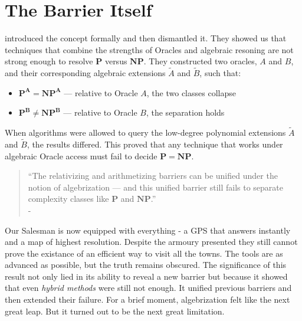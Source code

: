 \documentclass[12pt]{report}
\begin{document}
\section{The Barrier Itself}
\cite{arora2008algebrization} introduced the concept formally and then dismantled it.
They showed us that techniques that combine the strengths of Oracles and algebraic resoning are not strong enough to resolve $\mathbf{P}$ versus $\mathbf{NP}$.  
They constructed two oracles, $A$ and $B$, and their corresponding algebraic extensions $\tilde{A}$ and $\tilde{B}$, such that:
\begin{itemize}
    \item $\mathbf{P^A = NP^A}$ — relative to Oracle $A$, the two classes collapse
    \item $\mathbf{P^B \ne NP^B}$ — relative to Oracle $B$, the separation holds
\end{itemize}
When algorithms were allowed to query the low-degree polynomial extensions $\tilde{A}$ and $\tilde{B}$, the results differed.
This proved that any technique that works under algebraic Oracle access must fail to decide $\mathbf{P = NP}$.
\begin{quote}
    “The relativizing and arithmetizing barriers can be unified under the notion of algebrization — and this unified barrier still fails to separate complexity classes like $\mathbf{P}$ and $\mathbf{NP}$.”\\
    - \cite{arora2008algebrization}
\end{quote}

Our Salesman is now equipped with everything - a GPS that answers instantly and a map of highest resolution.
Despite the armoury presented they still cannot prove the existance of an efficient way to visit all the towns.
The tools are as advanced as possible, but the truth remains obscured.
The significance of this result not only lied in its ability to reveal a new barrier but because it showed that even \textit{hybrid methods} were still not enough.
It unified previous barriers and then extended their failure.
For a brief moment, algebrization felt like the next great leap.
But it turned out to be the next great limitation.
\end{document}
